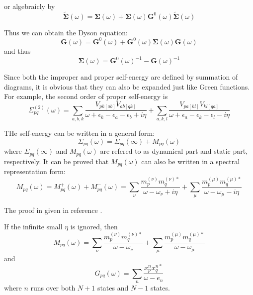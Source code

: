 or algebraicly by
\begin{equation}
	\tilde{\boldsymbol{\Sigma}}(\omega)=\boldsymbol{\Sigma}(\omega)+\boldsymbol{\Sigma}(\omega) \boldsymbol{G}^0(\omega) \tilde{\boldsymbol{\Sigma}}(\omega)
\end{equation}

Thus we can obtain the Dyson equation:
\begin{equation}
	\boldsymbol{G}(\omega)=\boldsymbol{G}^{0}(\omega)+\boldsymbol{G}^{0}(\omega) \boldsymbol{\Sigma}(\omega) \boldsymbol{G}(\omega)
\end{equation}
and thus
\begin{equation}
	\boldsymbol{\Sigma}(\omega)=\boldsymbol{G}^{0}(\omega)^{-1}-\boldsymbol{G}(\omega)^{-1}
\end{equation}

Since both the improper and proper self-energy are defined by summation of diagrams, it is obvious that they can also be expanded just like Green functions.
For example, the second order of proper self-energy is
\begin{equation} \label{selforder2}
	\Sigma_{p q}^{(2)}(\omega)=\sum_{a, b, k} \frac{V_{p k[a b]} V_{a b[q k]}}{\omega+\epsilon_{k}-\epsilon_{a}-\epsilon_{b}+i \eta}+\sum_{a, k, l} \frac{V_{p a[k l]} V_{k l[q a]}}{\omega+\epsilon_{a}-\epsilon_{k}-\epsilon_{l}-i \eta}
\end{equation}

THe self-energy can be written in a general form:
\begin{equation}
	\Sigma_{p q}(\omega)=\Sigma_{p q}(\infty)+M_{p q}(\omega)
\end{equation}
where $\Sigma_{p q}(\infty)$ and $M_{p q}(\omega)$ are refered to as dynamical part and static part, respectively.
It can be proved that $M_{pq}(\omega)$ can also be written in a spectral representation form:
\begin{equation}
	M_{p q}(\omega)=M_{p q}^{+}(\omega)+M_{p q}^{-}(\omega)=\sum_{\nu} \frac{m_{p}^{(\nu)} m_{q}^{(\nu) *}}{\omega-\omega_{\nu}+i \eta}+\sum_{\mu} \frac{m_{p}^{(\mu)} m_{q}^{(\mu) *}}{\omega-\omega_{\mu}-i \eta}
\end{equation}

The proof in given in reference \cite{Mpqproof1,Mpqproof2}.

If the infinite small $\eta$ is ignored, then 
\begin{equation}
	M_{p q}(\omega)=\sum_{\nu} \frac{m_{p}^{(\nu)} m_{q}^{(\nu) *}}{\omega-\omega_{\nu}}+\sum_{\mu} \frac{m_{p}^{(\mu)} m_{q}^{(\mu) *}}{\omega-\omega_{\mu}}
\end{equation}
and 
\begin{equation}
	G_{p q}(\omega)=\sum_{n} \frac{x_{p}^{n} x_{q}^{n *}}{\omega-e_{n}}
\end{equation}
where $n$ runs over both $N+1$ states and $N-1$ states.

